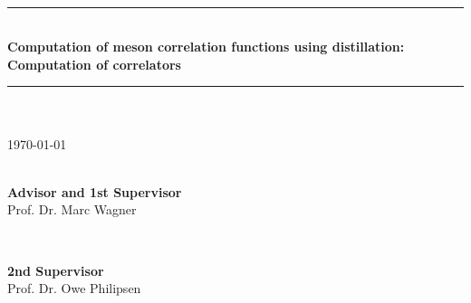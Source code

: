 \begin{titlepage}

\newcommand{\HRule}{\rule{\linewidth}{0.5mm}} %

\center %
 
\vspace*{2cm}

\\[1.5cm]


\HRule \\[0.6cm]
{ \huge \bfseries Computation of meson correlation functions using distillation: Computation of correlators}\\[0.4cm] %
\HRule \\[1.5cm]
 

\\
{\large \today}\\[2cm]
~

\begin{minipage}{0.4\textwidth}
\begin{flushleft} \large
\textbf{Advisor and 1st Supervisor}\\
Prof. Dr. Marc Wagner
\end{flushleft}
\end{minipage}
~
\begin{minipage}{0.4\textwidth}
\begin{flushright} \large
\textbf{2nd Supervisor}\\
Prof. Dr. Owe Philipsen
\end{flushright}
\end{minipage}\\[2cm]



\end{titlepage}
